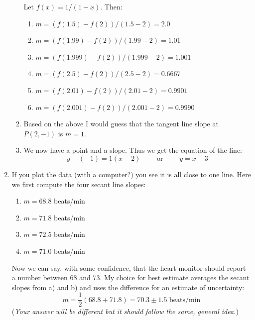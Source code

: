 \documentclass[11pt]{amsart}
\begin{document}
\begin{enumerate}
\begin{enumerate}
    Let $f(x) = 1/(1-x)$.  Then:
        \renewcommand{\labelenumiii}{(\roman{enumiii})}
        \begin{enumerate}
        \item $m = (f(1.5) - f(2)) / (1.5 - 2) = 2.0$
        \item $m = (f(1.99) - f(2)) / (1.99 - 2) = 1.01$
        \item $m = (f(1.999) - f(2)) / (1.999 - 2) = 1.001$
        \item $m = (f(2.5) - f(2)) / (2.5 - 2) = 0.6667$
        \item $m = (f(2.01) - f(2)) / (2.01 - 2) = 0.9901$
        \item $m = (f(2.001) - f(2)) / (2.001 - 2) = 0.9990$
        \end{enumerate}
    \item Based on the above I would guess that the tangent line slope at $P(2,-1)$ is $m=1$.
    \item We now have a point and a slope.  Thus we get the equation of the line:
        $$y - (-1) = 1 (x - 2) \qquad \text{ or } \qquad y = x -3$$
    \end{enumerate}

\medskip
\item  If you plot the data (with a computer?) you see it is all close to one line.  Here we first compute the four secant line slopes:

\medskip
    \renewcommand{\labelenumii}{\alph{enumii})}
    \begin{enumerate}
    \item $m=68.8$ beats/min
    \item $m=71.8$ beats/min
    \item $m=72.5$ beats/min
    \item $m=71.0$ beats/min
    \end{enumerate}

\medskip
\noindent Now we can say, with some confidence, that the heart monitor should report a number between $68$ and $73$.  My choice for best estimate averages the secant slopes from a) and b) and uses the difference for an estimate of uncertainty:
    $$m = \frac{1}{2} (68.8+71.8) = 70.3 \pm 1.5 \,\,\text{beats/min}$$
(\emph{Your answer will be different but it should follow the same, general idea.})
\end{enumerate}
\end{document}
